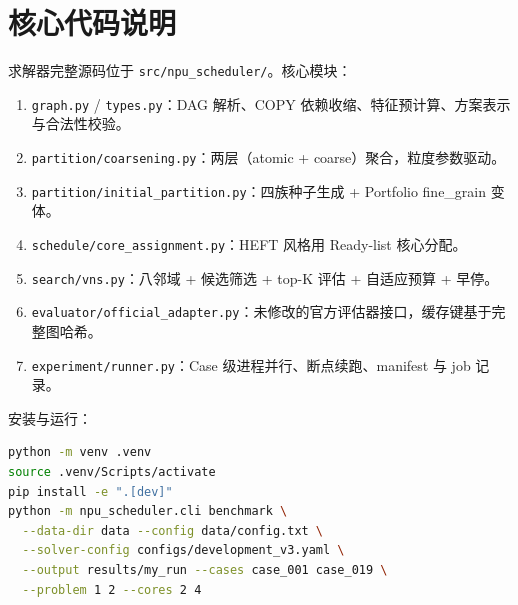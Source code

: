 \documentclass[bwprint]{gmcmthesis}
\begin{document}
\section{核心代码说明}
\label{app:code}

求解器完整源码位于 \texttt{src/npu\_scheduler/}。核心模块：

\begin{enumerate}
  \item \texttt{graph.py} / \texttt{types.py}：DAG 解析、COPY 依赖收缩、特征预计算、方案表示与合法性校验。
  \item \texttt{partition/coarsening.py}：两层（atomic + coarse）聚合，粒度参数驱动。
  \item \texttt{partition/initial\_partition.py}：四族种子生成 + Portfolio fine\_grain 变体。
  \item \texttt{schedule/core\_assignment.py}：HEFT 风格用 Ready-list 核心分配。
  \item \texttt{search/vns.py}：八邻域 + 候选筛选 + top-K 评估 + 自适应预算 + 早停。
  \item \texttt{evaluator/official\_adapter.py}：未修改的官方评估器接口，缓存键基于完整图哈希。
  \item \texttt{experiment/runner.py}：Case 级进程并行、断点续跑、manifest 与 job 记录。
\end{enumerate}

安装与运行：

\begin{lstlisting}[language=bash]
python -m venv .venv
source .venv/Scripts/activate
pip install -e ".[dev]"
python -m npu_scheduler.cli benchmark \
  --data-dir data --config data/config.txt \
  --solver-config configs/development_v3.yaml \
  --output results/my_run --cases case_001 case_019 \
  --problem 1 2 --cores 2 4
\end{lstlisting}
\end{document}
